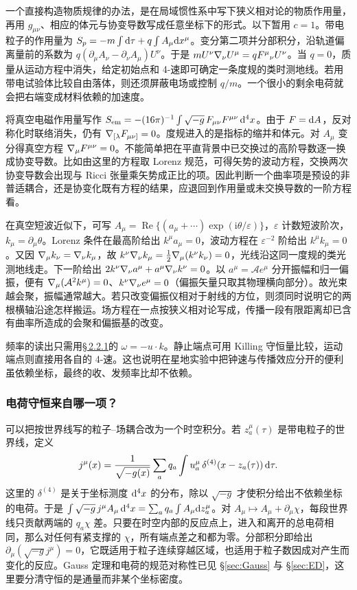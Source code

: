 一个直接构造物质规律的办法，是在局域惯性系中写下狭义相对论的物质作用量，再用 $g_{\mu\nu}$、相应的体元与协变导数写成任意坐标下的形式。以下暂用 $c=1$。带电粒子的作用量为 $S_p=-m\int\dd\tau+q\int A_\mu\dd x^\mu$。变分第二项并分部积分，沿轨道偏离量前的系数为 $q(\partial_\mu A_\nu-\partial_\nu A_\mu)U^\nu$。于是 $mU^\nu\nabla_\nu U^\mu=qF^\mu{}_\nu U^\nu$。当 $q=0$，质量从运动方程中消失，给定初始点和 4-速即可确定一条度规的类时测地线。若用带电试验体比较自由落体，则还须屏蔽电场或控制 $q/m$。一个很小的剩余电荷就会把右端变成材料依赖的加速度。

将真空电磁作用量写作 $S_{\rm em}=-(16\pi)^{-1}\int \sqrt{-g}\,F_{\mu\nu}F^{\mu\nu}\,\dd^4x$。由于 $F=\dd A$，反对称化时联络消失，仍有 $\nabla_{[\lambda}F_{\mu\nu]}=0$。度规进入的是指标的缩并和体元。对 $A_\mu$ 变分得真空方程 $\nabla_\mu F^{\mu\nu}=0$。不能简单把在平直背景中已交换过的高阶导数逐一换成协变导数。比如由这里的方程取 Lorenz 规范，可得矢势的波动方程，交换两次协变导数会出现与 Ricci 张量乘矢势成正比的项。因此判断一个曲率项是预设的非普适耦合，还是协变化既有方程的结果，应退回到作用量或未交换导数的一阶方程看。

在真空短波近似下，可写 $A_\mu=\operatorname{Re}\{(a_\mu+\cdots)\exp(\mathrm{i}\theta/\varepsilon)\}$，$\varepsilon$ 计数短波阶次，$k_\mu=\partial_\mu\theta$。Lorenz 条件在最高阶给出 $k^\mu a_\mu=0$，波动方程在 $\varepsilon^{-2}$ 阶给出 $k^\mu k_\mu=0$。又因 $\nabla_\mu k_\nu=\nabla_\nu k_\mu$，故 $k^\nu\nabla_\nu k_\mu=\tfrac12\nabla_\mu(k^\nu k_\nu)=0$，光线沿这同一度规的类光测地线走。下一阶给出 $2k^\nu\nabla_\nu a^\mu+a^\mu\nabla_\nu k^\nu=0$。以 $a^\mu=\mathcal A e^\mu$ 分开振幅和归一偏振，便有 $\nabla_\mu(\mathcal A^2 k^\mu)=0$、$k^\nu\nabla_\nu e^\mu=0$（偏振矢量只取其物理横向部分）。故光束越会聚，振幅通常越大。若只改变偏振仪相对于射线的方位，则须同时说明它的两根横轴沿途怎样搬运。场方程在一点按狭义相对论写成，传播一段有限距离却已含有曲率所造成的会聚和偏振基的改变。

频率的读出只需用\hyperlink{subsection.2.2.1}{\S\,2.2.1}的 $\omega=-u\cdot k$。静止端点可用 Killing 守恒量比较，运动端点则直接用各自的 4-速。这也说明在星地实验中把钟速与传播效应分开的便利虽依赖坐标，最终的收、发频率比却不依赖。

\subsubsection{电荷守恒来自哪一项？}

可以把按世界线写的粒子--场耦合改为一个时空积分。若 $z_a^\mu(\tau)$ 是带电粒子的世界线，定义
\[
 j^\mu(x)=\frac{1}{\sqrt{-g(x)}}\sum_a q_a
    \int u_a^\mu\,\delta^{(4)}(x-z_a(\tau))\,\dd\tau .
\]
这里的 $\delta^{(4)}$ 是关于坐标测度 $\dd^4x$ 的分布，除以 $\sqrt{-g}$ 才使积分给出不依赖坐标的电荷。于是 $\int\sqrt{-g}\,j^\mu A_\mu\,\dd^4x=\sum_aq_a\int A_\mu\dd z_a^\mu$。对 $A_\mu\mapsto A_\mu+\partial_\mu\chi$，每段世界线只贡献两端的 $q_a\chi$ 差。只要在时空内部的反应点上，进入和离开的总电荷相同，那么对任何有紧支撑的 $\chi$，所有端点差之和都为零。分部积分即给出 $\partial_\mu(\sqrt{-g}j^\mu)=0$，它既适用于粒子连续穿越区域，也适用于粒子数因成对产生而变化的反应。Gauss 定理和电荷的规范对称性已见 \S\ref{sec:Gauss} 与 \S\ref{sec:ED}，这里要分清守恒的是通量而非某个坐标密度。

